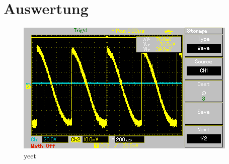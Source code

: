 


\section{Auswertung}
\label{sec:Auswertung}

\begin{figure}
    \centering
    \includegraphics[width=\textwidth]{Oszilloskop_0.BMP}
    \caption{yeet}
\end{figure}


